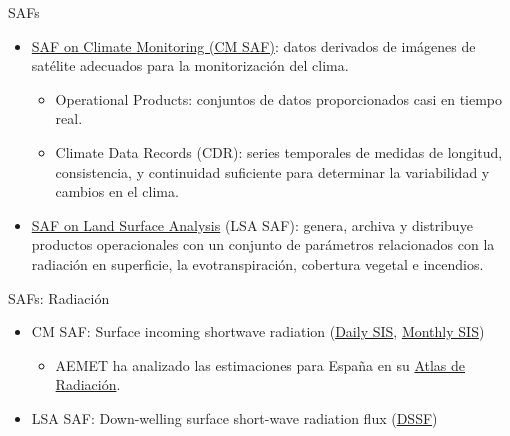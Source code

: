 \documentclass[aspectratio=169, usenames,svgnames,dvipsnames]{beamer}
\begin{document}
\begin{frame}[label={sec:org5bbacf4}]{SAFs}
\begin{itemize}
\item \href{https://wui.cmsaf.eu/safira/action/viewProduktSearch}{SAF on Climate Monitoring (CM SAF)}: datos derivados de imágenes de satélite adecuados para la monitorización del clima.

\begin{itemize}
\item Operational Products: conjuntos de datos proporcionados casi en tiempo real.

\item Climate Data Records (CDR): series temporales de medidas de longitud, consistencia, y continuidad suficiente para determinar la variabilidad y cambios en el clima.
\end{itemize}

\item \href{https://landsaf.ipma.pt/en/}{SAF on Land Surface Analysis} (LSA SAF): genera, archiva y distribuye productos operacionales con un conjunto de parámetros relacionados con la radiación en superficie, la evotranspiración, cobertura vegetal e incendios.
\end{itemize}
\end{frame}

\begin{frame}[label={sec:orgcb71402}]{SAFs: Radiación}
\begin{itemize}
\item \alert{CM SAF}: Surface incoming shortwave radiation (\href{https://wui.cmsaf.eu/safira/action/viewProduktDetails?eid=21987\_21988\&fid=27}{Daily SIS}, \href{https://wui.cmsaf.eu/safira/action/viewProduktDetails?eid=21989\_21990\&fid=27}{Monthly SIS})

\begin{itemize}
\item AEMET ha analizado las estimaciones para España en su \href{http://www.aemet.es/es/serviciosclimaticos/datosclimatologicos/atlas\_radiacion\_solar}{Atlas de Radiación}.
\end{itemize}

\item \alert{LSA SAF}: Down-welling surface short-wave radiation flux (\href{https://landsaf.ipma.pt/en/products/longwave-shortwave-radiation/dssf/}{DSSF})
\end{itemize}
\end{frame}
\end{document}
